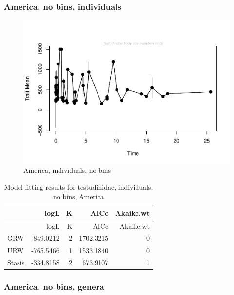 \documentclass[]{article}
\begin{document}
\newpage

\subsubsection{America, no bins,
individuals}\label{america-no-bins-individuals}

\begin{figure}[htbp]
\centering
\includegraphics{MA_JJ_files/figure-latex/paleoTS, no bins individuals, America-1.pdf}
\caption{America, individuals, no bins}
\end{figure}

\begin{longtable}[]{@{}lrrrr@{}}
\caption{Model-fitting results for testudinidae, individuals, no bins,
America}\tabularnewline
\toprule
& logL & K & AICc & Akaike.wt\tabularnewline
\midrule
\endfirsthead
\toprule
& logL & K & AICc & Akaike.wt\tabularnewline
\midrule
\endhead
GRW & -849.0212 & 2 & 1702.3215 & 0\tabularnewline
URW & -765.5466 & 1 & 1533.1840 & 0\tabularnewline
Stasis & -334.8158 & 2 & 673.9107 & 1\tabularnewline
\bottomrule
\end{longtable}

\newpage 

\subsubsection{America, no bins, genera}\label{america-no-bins-genera}
\end{document}
